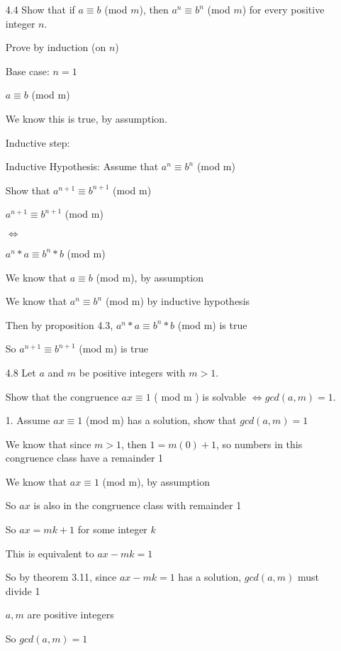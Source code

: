 \documentclass[11pt]{article}
\begin{document}
\begin{itemize}


\item[4.4] Show that if $a \equiv b$ (mod $m$), then $a^n  \equiv b^n$ (mod $m$) for every positive integer $n$.

Prove by induction (on $n$)

Base case: $n = 1$

$a \equiv b $ (mod m)

We know this is true, by assumption.

Inductive step:

Inductive Hypothesis: Assume that $a^n \equiv b^n $ (mod m)

Show that $a^{n+1} \equiv b^{n+1} $ (mod m)

$a^{n+1} \equiv b^{n+1} $ (mod m)

$\iff$ %

$a^{n} * a \equiv b^{n} * b $ (mod m)

We know that $a \equiv b $ (mod m), by assumption

We know that $a^n \equiv b^n $ (mod m) by inductive hypothesis

Then by proposition 4.3, $a^{n} * a\equiv b^{n} * b $ (mod m) is true

So $a^{n+1} \equiv b^{n+1} $ (mod m) is true

\newpage

\item[4.8]
Let $a$ and $m$ be positive integers with $m > 1$.

Show that the congruence $ax \equiv 1$ ( mod m ) is solvable $\iff gcd(a,m) = 1$.

1. Assume $ax \equiv 1 $ (mod m) has a solution, show that $gcd(a,m) = 1$

We know that since $m > 1$, then $1 = m(0) + 1$, so numbers in this congruence class have a remainder 1

We know that $ax \equiv 1$ (mod m), by assumption

So $ax$ is also in the congruence class with remainder 1

So $ax = mk + 1$ for some integer $k$

This is equivalent to $ax - mk = 1$

So by theorem 3.11, since $ax - mk = 1$ has a solution, $gcd(a,m)$ must divide 1

$a, m$ are positive integers

So $gcd(a,m) = 1$


\end{itemize}
\end{document}
